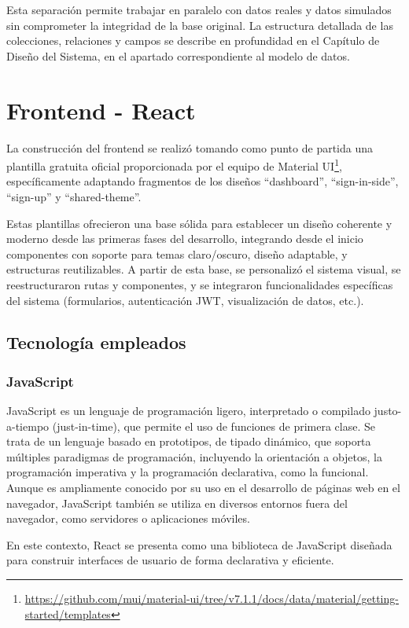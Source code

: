 Esta separación permite trabajar en paralelo con datos reales y datos simulados sin comprometer la integridad de la base original. La estructura detallada de las colecciones, relaciones y campos se describe en profundidad en el Capítulo de Diseño del Sistema, en el apartado correspondiente al modelo de datos.

\section{Frontend - React\cite{reactDocs}}
La construcción del frontend se realizó tomando como punto de partida una plantilla gratuita oficial proporcionada por el equipo de Material UI\footnote{\url{https://github.com/mui/material-ui/tree/v7.1.1/docs/data/material/getting-started/templates}}, específicamente adaptando fragmentos de los diseños ``dashboard'', ``sign-in-side'', ``sign-up'' y ``shared-theme''.

Estas plantillas ofrecieron una base sólida para establecer un diseño coherente y moderno desde las primeras fases del desarrollo, integrando desde el inicio componentes con soporte para temas claro/oscuro, diseño adaptable, y estructuras reutilizables. A partir de esta base, se personalizó el sistema visual, se reestructuraron rutas y componentes, y se integraron funcionalidades específicas del sistema (formularios, autenticación JWT, visualización de datos, etc.).

\subsection{Tecnología empleados}
\subsubsection*{JavaScript\cite{javascriptMdn}}
JavaScript es un lenguaje de programación ligero, interpretado o compilado justo-a-tiempo (just-in-time), que permite el uso de funciones de primera clase. Se trata de un lenguaje basado en prototipos, de tipado dinámico, que soporta múltiples paradigmas de programación, incluyendo la orientación a objetos, la programación imperativa y la programación declarativa, como la funcional. Aunque es ampliamente conocido por su uso en el desarrollo de páginas web en el navegador, JavaScript también se utiliza en diversos entornos fuera del navegador, como servidores o aplicaciones móviles.

En este contexto, React se presenta como una biblioteca de JavaScript diseñada para construir interfaces de usuario de forma declarativa y eficiente. 

